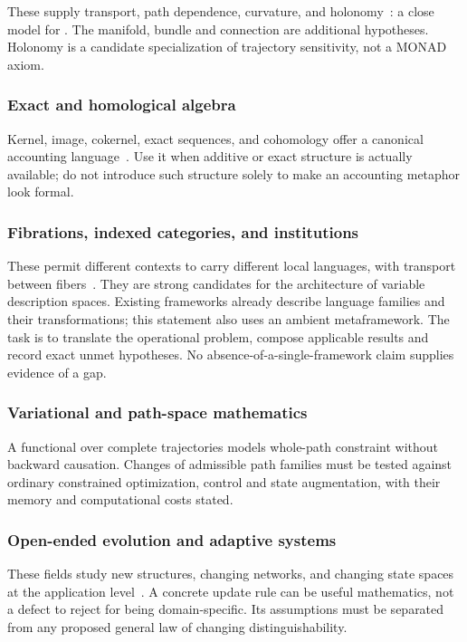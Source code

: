 These supply transport, path dependence, curvature, and
holonomy~\cite{kobayashi1963foundations}: a
close model for . The manifold, bundle
and connection are additional hypotheses. Holonomy is a candidate specialization of
trajectory sensitivity, not a MONAD axiom.

\subsubsection{Exact and homological algebra}\label{ss:homological}

Kernel, image, cokernel, exact sequences, and cohomology offer a
canonical accounting language~\cite{weibel1994introduction}. Use it
when additive or exact structure is actually available; do not introduce
such structure solely to make an accounting metaphor look formal.

\subsubsection{Fibrations, indexed categories, and institutions}

These permit different contexts to carry different local languages,
with transport between
fibers~\cite{goguen1992institutions,jacobs1999categorical}. They are
strong candidates for the
architecture of variable description spaces. Existing frameworks already
describe language families and their transformations; this statement also
uses an ambient metaframework. The task is to translate the operational
problem, compose applicable results and record exact unmet hypotheses.
No absence-of-a-single-framework claim supplies evidence of a gap.

\subsubsection{Variational and path-space mathematics}

A functional over complete trajectories models whole-path constraint
without backward causation. Changes of admissible path families must be
tested against ordinary constrained optimization, control and state
augmentation, with their memory and computational costs stated.

\subsubsection{Open-ended evolution and adaptive systems}

These fields study new structures, changing networks, and changing
state spaces at the application level~\cite{bedau2000open}. A concrete
update rule can be useful mathematics, not a defect to reject for being
domain-specific. Its assumptions must be separated from any proposed
general law of changing distinguishability.

